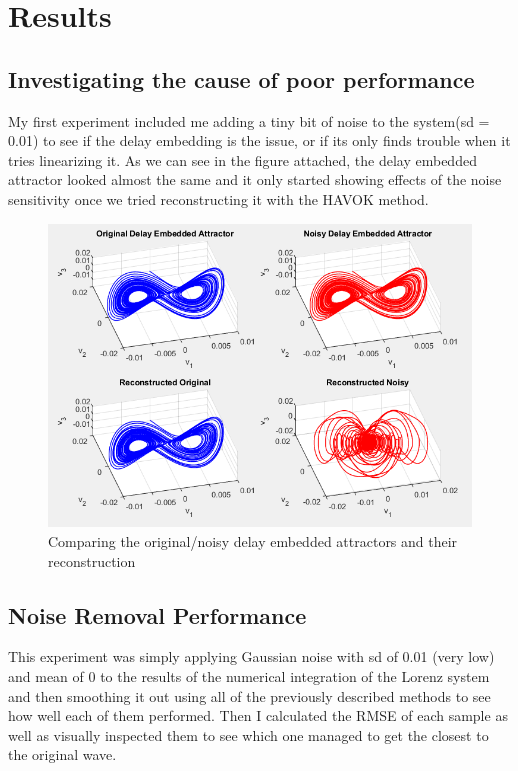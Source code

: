 \documentclass[11pt]{article}
\begin{document}
	\section{Results}
	
	\subsection{Investigating the cause of poor performance}
	My first experiment included me adding a tiny bit of noise to the system(sd = 0.01) to see if the delay embedding is the issue, or if its only finds trouble when it tries linearizing it. As we can see in the figure attached, the delay embedded attractor looked almost the same and it only started showing effects of the noise sensitivity once we tried reconstructing it with the HAVOK method.
	
	\begin{figure}
		\centering
		\includegraphics[width=0.7\linewidth]{Figure3}
		\caption{Comparing the original/noisy delay embedded attractors and their reconstruction}
		\label{fig:figure1}
	\end{figure}
	
	
	
	\subsection{Noise Removal Performance}
	This experiment was simply applying Gaussian noise with sd of 0.01 (very low) and mean of 0 to the results of the numerical integration of the Lorenz system and then smoothing it out using all of the previously described methods to see how well each of them performed. Then I calculated the RMSE of each sample as well as visually inspected them to see which one managed to get the closest to the original wave.
	
\end{document}
